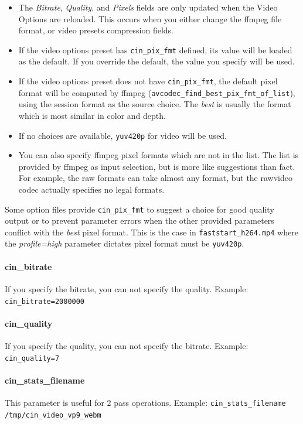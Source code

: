 \begin{itemize}
    \item The \textit{Bitrate}, \textit{Quality}, and \textit{Pixels} fields are only updated when the Video Options are reloaded.  This
    occurs when you either change the ffmpeg file format, or video presets compression fields.
    \item If the video options preset has \texttt{cin\_pix\_fmt} defined, its value will be loaded as the default.  If you
    override the default, the value you specify will be used.
    \item If the video options preset does not have \texttt{cin\_pix\_fmt}, the default pixel format will be computed by ffmpeg (\texttt{avcodec\_find\_best\_pix\_fmt\_of\_list}), using the session format as the source choice.  The
    \textit{best} is usually the format which is most similar in color and depth.
    \item If no choices are available, \texttt{yuv420p} for video will be used.
    \item You can also specify ffmpeg pixel formats which are not in the list.  The list is provided by ffmpeg as input selection, but is more like suggestions than fact.  For example, the raw formats can take almost any format, but the rawvideo codec actually specifies no legal formats.
\end{itemize}

\noindent Some option files provide \texttt{cin\_pix\_fmt} to suggest a choice for good quality output or to prevent parameter errors when the other provided parameters conflict with the \textit{best} pixel format.  This is the case in \texttt{faststart\_h264.mp4} where the \textit{profile=high} parameter dictates pixel format must be \texttt{yuv420p}.

\paragraph{cin\_bitrate} If you specify the bitrate, you can not specify the quality.
Example: \texttt{cin\_bitrate=2000000}

\paragraph{cin\_quality} If you specify the quality, you can not specify the bitrate.
Example: \texttt{cin\_quality=7}

\paragraph{cin\_stats\_filename} This parameter is useful for 2 pass operations.
Example: \texttt{cin\_stats\_filename /tmp/cin\_video\_vp9\_webm}

